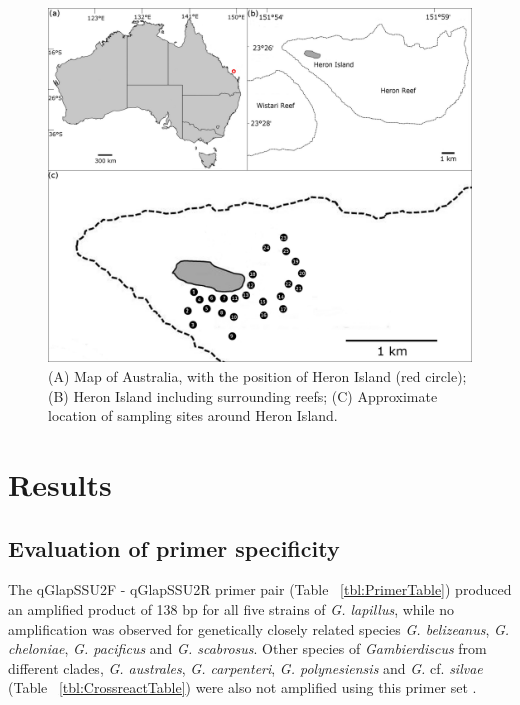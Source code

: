 \documentclass[12pt]{article}
\begin{document}
\begin{figure} 
\includegraphics[scale=1.7]{Hero_qpcr-figs/Fig1_Heron_sample-map_Nov18.png} 
\caption{(A) Map of Australia, with the position of Heron Island (red circle); (B) Heron Island including surrounding reefs; (C) Approximate location of sampling sites around Heron Island.} 
\label{fig:samplesites}
\end{figure} 


\newpage
\section*{Results}
\subsection*{Evaluation of primer specificity}
\FloatBarrier
The qGlapSSU2F - qGlapSSU2R primer pair (Table ~\ref{tbl:PrimerTable}) produced an amplified product of 138 bp for all five strains of \emph{G. lapillus}, while no amplification was observed for genetically closely related species \emph{G. belizeanus}, \emph{G. cheloniae}, \emph{G. pacificus} and \emph{G. scabrosus}. 
Other species of \emph{Gambierdiscus} from different clades, \emph{G. australes}, \emph{G. carpenteri}, \emph{G. polynesiensis} and \emph{G.} cf. \emph{silvae} (Table ~\ref{tbl:CrossreactTable}) were also not amplified using this primer set \citep{smith2016new,kretzschmar2017characterization}.
\end{document}
